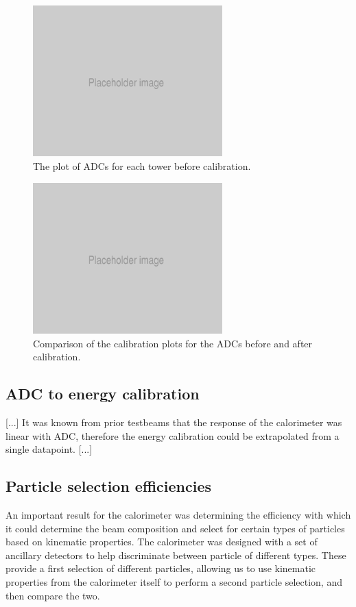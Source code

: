 \begin{figure}[h]
	\centering
	\includegraphics[width=0.65\textwidth]{../Pictures/Placeholder.png}
	\caption{The plot of ADCs for each tower before calibration.}
	\label{figure:testbeam/results/calibrationbefore}
\end{figure}

\begin{figure}[h]
	\centering
	\includegraphics[width=0.65\textwidth]{../Pictures/Placeholder.png}
	\caption{Comparison of the calibration plots for the ADCs before and after calibration.}
	\label{figure:testbeam/results/calibrationafter}
\end{figure}

\subsection{ADC to energy calibration}
[...] It was known from prior testbeams that the response of the calorimeter was linear with ADC, therefore the energy calibration could be extrapolated from a single datapoint. [...]

\subsection{Particle selection efficiencies}
An important result for the calorimeter was determining the efficiency with which it could determine the beam composition and select for certain types of particles based on kinematic properties. The calorimeter was designed with a set of ancillary detectors to help discriminate between particle of different types. These provide a first selection of different particles, allowing us to use kinematic properties from the calorimeter itself to perform a second particle selection, and then compare the two.

